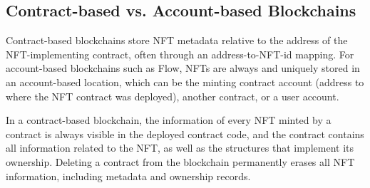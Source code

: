 \documentclass[../3_VotingAndNFTs.tex]{subfiles}
\begin{document}
\subsection{Contract-based vs. Account-based Blockchains}
\label{sec:contract-to-account-storage}
Contract-based blockchains store NFT metadata relative to the address of the NFT-implementing contract, often through an address-to-NFT-id mapping. For account-based blockchains such as Flow, NFTs are always and uniquely stored in an account-based location, which can be the minting contract account (address to where the NFT contract was deployed), another contract, or a user account.
\par
In a contract-based blockchain, the information of every NFT minted by a contract is always visible in the deployed contract code, and the contract contains all information related to the NFT, as well as the structures that implement its ownership. Deleting a contract from the blockchain permanently erases all NFT information, including metadata and ownership records.
\end{document}
